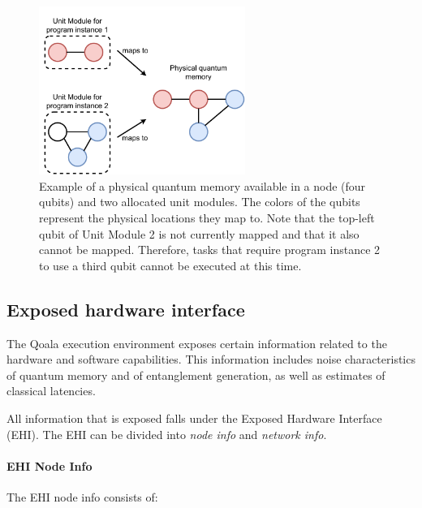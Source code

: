 \begin{figure}[t]
    \centering
    \includegraphics[width=0.6\textwidth]{figures/qoala/unit_module.pdf}
    \caption{Example of a physical quantum memory available in a node (four qubits) and two allocated unit modules. The colors of the qubits represent the physical locations they map to. Note that the top-left qubit of Unit Module 2 is not currently mapped and that it also cannot be mapped. Therefore, tasks that require program instance 2 to use a third qubit cannot be executed at this time.}
    \label{qoala:fig:app:unit_module}
\end{figure}



\subsection{Exposed hardware interface}
\label{qoala:sec:app:ehi}
The Qoala execution environment exposes certain information related to the hardware and software capabilities.
This information includes noise characteristics of quantum memory and of entanglement generation, as well as estimates of classical latencies.

All information that is exposed falls under the Exposed Hardware Interface (EHI).
The EHI can be divided into \textit{node info} and \textit{network info}.


\paragraph{EHI Node Info}
The EHI node info consists of:

